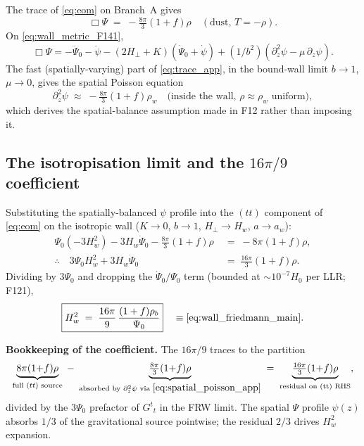 \documentclass[aps,prd,twocolumn,nofootinbib,floatfix,superscriptaddress]{revtex4-2}
\begin{document}
The trace of \eqref{eq:eom} on Branch~A gives
\begin{equation}
\label{eq:trace_app}
\Box\Psi \;=\; -\tfrac{8\pi}{3}(1{+}f)\rho \quad
(\text{dust, } T = -\rho).
\end{equation}
On \eqref{eq:wall_metric_F141},
\begin{equation}
\Box\Psi = -\ddot\Psi_0 - \ddot\psi - (2H_\perp + K)(\dot\Psi_0 + \dot\psi)
+ (1/b^2)(\partial_z^2\psi - \mu\,\partial_z\psi).
\end{equation}
The fast (spatially-varying) part of \eqref{eq:trace_app}, in the
bound-wall limit $b \to 1$, $\mu \to 0$, gives the spatial Poisson
equation
\begin{equation}
\label{eq:spatial_poisson_app}
\partial_z^2\psi \;\approx\; -\tfrac{8\pi}{3}(1{+}f)\rho_w
\quad\text{(inside the wall, }\rho \approx \rho_w\text{ uniform)},
\end{equation}
which derives the spatial-balance assumption made in F12 rather than
imposing it.

\subsection{The isotropisation limit and the $16\pi/9$ coefficient}

Substituting the spatially-balanced $\psi$ profile into the
$(tt)$ component of \eqref{eq:eom} on the isotropic wall
($K \to 0$, $b \to 1$, $H_\perp \to H_w$, $a \to a_w$):
\begin{align}
\Psi_0(-3 H_w^2) - 3 H_w \dot\Psi_0 - \tfrac{8\pi}{3}(1{+}f)\rho
\;&=\; -8\pi (1{+}f)\rho, \\
\therefore\quad 3\Psi_0 H_w^2 + 3 H_w \dot\Psi_0
\;&=\; \tfrac{16\pi}{3}(1{+}f)\rho.
\label{eq:wall_pre_div_app}
\end{align}
Dividing by $3\Psi_0$ and dropping the $\dot\Psi_0/\Psi_0$ term
(bounded at $\sim 10^{-7} H_0$ per LLR; F121),
\begin{equation}
\label{eq:wall_friedmann_derived_app}
\boxed{H_w^2 \;=\; \frac{16\pi}{9}\,\frac{(1+f)\rho_b}{\Psi_0}}
\quad \equiv \eqref{eq:wall_friedmann_main}.
\end{equation}

\textbf{Bookkeeping of the coefficient.}
The $16\pi/9$ traces to the partition
\begin{equation}
\label{eq:coeff_book_app}
\underbrace{8\pi(1{+}f)\rho}_{\text{full }(tt)\text{ source}}
\;-\;
\underbrace{\tfrac{8\pi}{3}(1{+}f)\rho}_{\text{absorbed by }\partial_z^2\psi
\text{ via }\eqref{eq:spatial_poisson_app}}
\;=\;
\underbrace{\tfrac{16\pi}{3}(1{+}f)\rho}_{\text{residual on (tt) RHS}},
\end{equation}
divided by the $3\Psi_0$ prefactor of $G^t{}_t$ in the FRW limit.
The spatial $\Psi$ profile $\psi(z)$ absorbs $1/3$ of the gravitational
source pointwise; the residual $2/3$ drives $H_w^2$ expansion.
\end{document}
